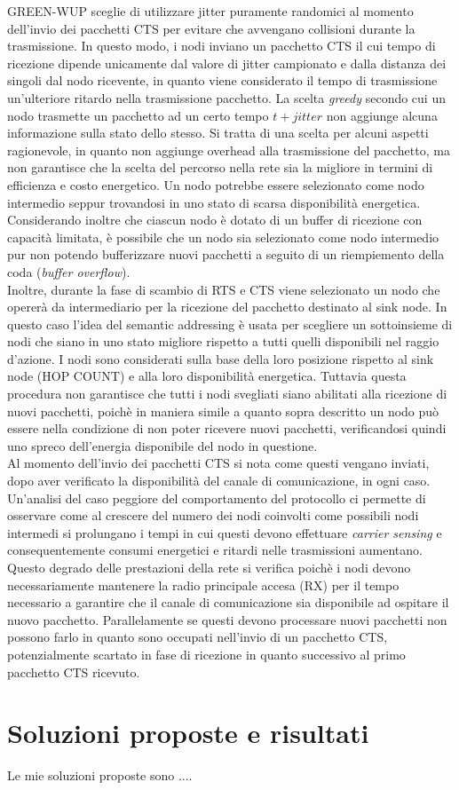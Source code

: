 \documentclass{report}
\begin{document}
GREEN-WUP sceglie di utilizzare jitter puramente randomici al momento dell'invio dei pacchetti CTS per evitare che avvengano collisioni durante
la trasmissione. In questo modo, i nodi inviano un pacchetto CTS il cui tempo di ricezione dipende unicamente dal valore di jitter
campionato e dalla distanza dei singoli dal nodo ricevente, in quanto viene considerato il tempo di trasmissione un'ulteriore ritardo nella
trasmissione pacchetto. La scelta \emph{greedy} secondo cui un nodo trasmette un pacchetto ad un certo tempo $t+jitter$ non aggiunge alcuna
informazione sulla stato dello stesso. Si tratta di una scelta per alcuni aspetti ragionevole, in quanto non aggiunge overhead alla trasmissione
del pacchetto, ma non garantisce che la scelta del percorso nella rete sia la migliore in termini di efficienza e costo energetico. Un nodo
potrebbe essere selezionato come nodo intermedio seppur trovandosi in uno stato di scarsa disponibilità energetica. Considerando inoltre che 
ciascun nodo è dotato di un buffer di ricezione con capacità limitata, è possibile che un nodo sia selezionato come nodo intermedio pur non 
potendo bufferizzare nuovi pacchetti a seguito di un riempiemento della coda (\emph{buffer overflow}).\\

Inoltre, durante la fase di scambio di RTS e CTS viene selezionato un nodo che opererà da intermediario per la ricezione del pacchetto destinato
al sink node. In questo caso l'idea del semantic addressing è usata per scegliere un sottoinsieme di nodi che siano in uno stato migliore 
rispetto a tutti quelli disponibili nel raggio d'azione. I nodi sono considerati sulla base della loro posizione rispetto al
sink node (HOP COUNT) e alla loro disponibilità energetica. Tuttavia questa procedura non garantisce che tutti i nodi svegliati siano abilitati
alla ricezione di nuovi pacchetti, poichè in maniera simile a quanto sopra descritto un nodo può essere nella condizione di non poter
ricevere nuovi pacchetti, verificandosi quindi uno spreco dell'energia disponibile del nodo in questione.\\

Al momento dell'invio dei pacchetti CTS si nota come questi vengano inviati, dopo aver verificato la disponibilità del canale di comunicazione,
in ogni caso. Un'analisi del caso peggiore del comportamento del protocollo ci permette di osservare come al crescere del numero dei nodi coinvolti
come possibili nodi intermedi si prolungano i tempi in cui questi devono effettuare \emph{carrier sensing} e consequentemente consumi energetici
e ritardi nelle trasmissioni aumentano. Questo degrado delle prestazioni della rete si verifica poichè i nodi devono necessariamente mantenere
la radio principale accesa (RX) per il tempo necessario a garantire che il canale di comunicazione sia disponibile ad ospitare il nuovo pacchetto.
Parallelamente se questi devono processare nuovi pacchetti non possono farlo in quanto sono occupati nell'invio di un pacchetto CTS,
potenzialmente scartato in fase di ricezione in quanto successivo al primo pacchetto CTS ricevuto.

\section{Soluzioni proposte e risultati}

Le mie soluzioni proposte sono ....

\end{document}

